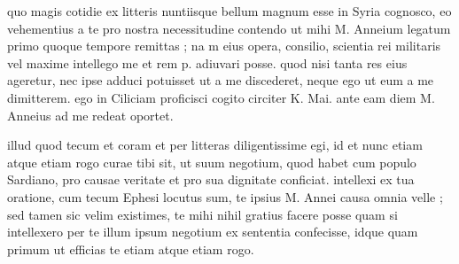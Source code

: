 


 quo magis cotidie ex litteris nuntiisque bellum magnum esse in Syria cognosco, eo vehementius a te pro nostra necessitudine contendo ut mihi M. Anneium legatum primo quoque tempore remittas ; na m eius opera, consilio, scientia rei militaris vel maxime intellego me et rem p. adiuvari posse. quod nisi tanta res eius ageretur, nec ipse adduci potuisset ut a me discederet, neque ego ut eum a me dimitterem. ego in Ciliciam proficisci cogito circiter K. Mai. ante eam diem M. Anneius ad me redeat oportet.

 illud quod tecum et coram et per litteras diligentissime egi, id et nunc etiam atque etiam rogo curae tibi sit, ut suum negotium, quod habet cum populo Sardiano, pro causae veritate et pro sua dignitate conficiat. intellexi ex tua oratione, cum tecum Ephesi locutus sum, te ipsius M. Annei causa omnia velle ; sed tamen sic velim existimes, te mihi nihil gratius facere posse quam si intellexero per te illum ipsum negotium ex sententia confecisse, idque quam primum ut efficias te etiam atque etiam rogo.
